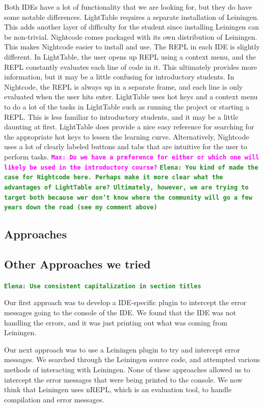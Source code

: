 \documentclass[12pt]{article}
\newcommand{\comment}[1]{{\bf \tt  {#1}}}
\newcommand{\emcomment}[1]{\textcolor{ForestGreen}{\comment{Elena: {#1}}}}
\newcommand{\mmcomment}[1]{\textcolor{magenta}{\comment{Max: {#1}}}}
\begin{document}
Both IDEs have a lot of functionality that we are looking for, but they do have some notable differences. LightTable %
requires a separate installation of Leiningen. %
This adds another layer of difficulty for the student since installing Leiningen can be non-trivial. Nightcode comes packaged with its own distribution of Leiningen. This makes Nightcode easier to install and use. The REPL in each IDE is slightly different. In LightTable, the user opens up REPL using a context menu, and the REPL constantly evaluates each line of code in it. This ultimately provides more information, but it may be a little confusing for introductory students. In Nightcode, the REPL is always up in a separate frame, and each line is only evaluated when the user hits enter. LightTable uses hot keys and a context menu to do a lot of the tasks in LightTable such as running the project or starting a REPL. This is less familiar to introductory students, and it may be a little daunting at first. LightTable does provide a nice easy reference for searching for the appropriate hot keys to lessen the learning curve. Alternatively, Nightcode uses a lot of clearly labeled buttons and tabs that are intuitive for the user to perform tasks. \mmcomment{Do we have a preference for either or which one will likely be used in the introductory course?} 
\emcomment{You kind of made the case for Nightcode here. Perhaps make it more clear what the advantages of LightTable are? Ultimately, however, we are trying to target both because wer don't know where the community will go a few years down the road (see my comment above)}

\subsection{Approaches}

\subsection{Other Approaches we tried}
\emcomment{Use consistent capitalization in section titles}

Our first approach was to develop a IDE-specific plugin to intercept the error messages going to the console of the IDE. We found that the IDE was not handling the errors, and it was just printing out what was coming from Leiningen.

Our next approach was to use a Leiningen plugin to try and intercept error messages. We searched through the Leiningen source code, and attempted various methods of interacting with Leiningen. None of these approaches allowed us to intercept the error messages that were being printed to the console. We now think that Leiningen uses nREPL, which is an evaluation tool, to handle compilation and error messages.
\end{document}

